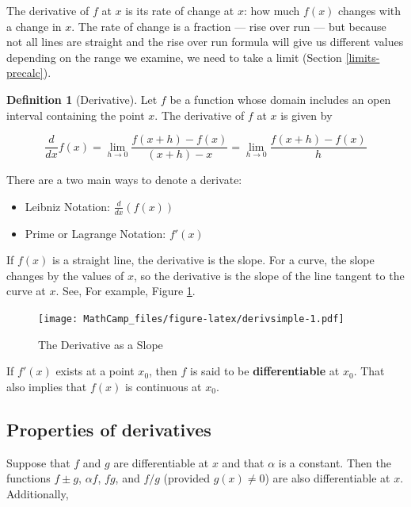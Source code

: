 \documentclass[
]{book}
\providecommand{\tightlist}{%
  \setlength{\itemsep}{0pt}\setlength{\parskip}{0pt}}
\theoremstyle{definition}
\newtheorem{definition}{Definition}[chapter]
\theoremstyle{definition}
\theoremstyle{definition}
\theoremstyle{definition}
\theoremstyle{remark}
\begin{document}
The derivative of \(f\) at \(x\) is its rate of change at \(x\): how much \(f(x)\) changes with a change in \(x\). The rate of change is a fraction --- rise over run --- but because not all lines are straight and the rise over run formula will give us different values depending on the range we examine, we need to take a limit (Section \ref{limits-precalc}).

\begin{definition}[Derivative]
\protect\hypertarget{def:unnamed-chunk-202}{}{\label{def:unnamed-chunk-202} {} }Let \(f\) be a function whose domain includes an open interval containing the point \(x\). The derivative of \(f\) at \(x\) is given by

\[\frac{d}{dx}f(x) =\lim\limits_{h\to 0} \frac{f(x+h)-f(x)}{(x+h)-x} = \lim\limits_{h\to 0} \frac{f(x+h)-f(x)}{h}
\]

There are a two main ways to denote a derivate:

\begin{itemize}
\tightlist
\item
  Leibniz Notation: \(\frac{d}{dx}(f(x))\)
\item
  Prime or Lagrange Notation: \(f'(x)\)
\end{itemize}
\end{definition}

If \(f(x)\) is a straight line, the derivative is the slope. For a curve, the slope changes by the values of \(x\), so the derivative is the slope of the line tangent to the curve at \(x\). See, For example, Figure \ref{fig:derivsimple}.

\begin{figure}
\centering
\texttt{[image: MathCamp\_files/figure-latex/derivsimple-1.pdf]}
\caption{\label{fig:derivsimple}The Derivative as a Slope}
\end{figure}

If \(f'(x)\) exists at a point \(x_0\), then \(f\) is said to be \textbf{differentiable} at \(x_0\). That also implies that \(f(x)\) is continuous at \(x_0\).

\hypertarget{properties-of-derivatives}{%
\subsection*{Properties of derivatives}\label{properties-of-derivatives}}

Suppose that \(f\) and \(g\) are differentiable at \(x\) and that \(\alpha\) is a constant. Then the functions \(f\pm g\), \(\alpha f\), \(f g\), and \(f/g\) (provided \(g(x)\ne 0\)) are also differentiable at \(x\). Additionally,
\end{document}
